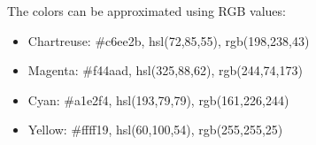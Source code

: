 \documentclass[10pt]{article}
\begin{document}
The colors can be approximated using RGB values:

\begin{itemize}
  \item Chartreuse: \#c6ee2b, hsl(72,85,55), rgb(198,238,43)
  \item Magenta: \#f44aad, hsl(325,88,62), rgb(244,74,173)
  \item Cyan: \#a1e2f4, hsl(193,79,79), rgb(161,226,244)
  \item Yellow: \#ffff19, hsl(60,100,54), rgb(255,255,25)
\end{itemize}
\end{document}
